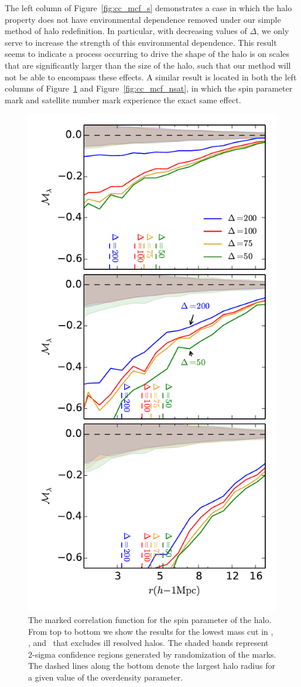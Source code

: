 \documentclass[usenatbib,usegraphicx,letterpaper]{mn2e}
\begin{document}
The left column of Figure~\ref{fig:cc_mcf_s} demonstrates a case in which the halo property does not have environmental dependence removed under our simple method of halo redefinition. In particular, with decreasing values of $\Delta$, we only serve to increase the strength of this environmental dependence. This result seems to indicate a process occurring to drive the shape of the halo is on scales that are significantly larger than the size of the halo, such that our method will not be able to encompass these effects. A similar result is located in both the left columns of Figure~\ref{fig:cc_mcf_spin} and Figure~\ref{fig:cc_mcf_nsat}, in which the spin parameter mark and satellite number mark experience the exact same effect.

\begin{figure}
	\centering
	\includegraphics[width=.4\textwidth]{all_mcf_spin_z00_cutcomp.pdf}
	\caption{The marked correlation function for the spin parameter of the halo. From top to bottom we show the results for the lowest mass cut in \simA, \simB, and \simC \ that excludes ill resolved halos. The shaded bands represent 2-sigma confidence regions generated by randomization of the marks. The dashed lines along the bottom denote the largest halo radius for a given value of the overdensity parameter.}
	\label{fig:cc_mcf_spin}
\end{figure}
\end{document}
